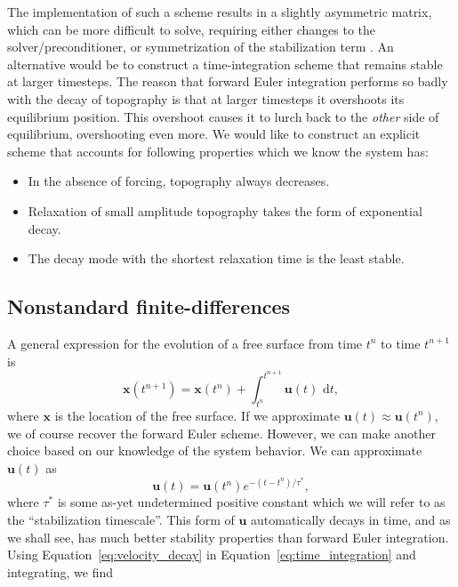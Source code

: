 \documentclass[preprint,12pt,authoryear]{elsarticle}
\begin{document}
The implementation of such a scheme results in a slightly 
asymmetric matrix, which can be more difficult to solve, requiring either
changes to the solver/preconditioner, or symmetrization of the stabilization term \citep{kaus2010stabilization}.
An alternative would be to construct a time-integration scheme that remains stable at larger timesteps.
The reason that forward Euler integration performs so badly with the decay of topography is that 
at larger timesteps it overshoots its equilibrium position. This overshoot causes it to lurch back 
to the \emph{other} side of equilibrium, overshooting even more.
We would like to construct an explicit scheme that accounts for following properties which we know the system has:
\begin{itemize}
\item In the absence of forcing, topography always decreases.
\item Relaxation of small amplitude topography takes the form of exponential decay.
\item The decay mode with the shortest relaxation time is the least stable.
\end{itemize}

\subsection{Nonstandard finite-differences}

A general expression for the evolution of a free surface from time $t^n$ to time $t^{n+1}$ is 
\begin{equation}
\mathbf{x}(t^{n+1}) = \mathbf{x}(t^n) + \int_{t^{n}}^{t^{n+1}} \mathbf{u}(t) \text{ d}t,
\label{eq:time_integration}
\end{equation}
where $\mathbf{x}$ is the location of the free surface.  If we approximate $\mathbf{u}(t) \approx \mathbf{u}(t^{n})$, 
we of course recover the forward Euler scheme.
However, we can make another choice based on our knowledge of the system behavior. 
We can approximate $\mathbf{u}(t)$ as
\begin{equation}
\mathbf{u}(t) = \mathbf{u}(t^n) e^{-(t-t^n)/\tau^*},
\label{eq:velocity_decay}
\end{equation}
where $\tau^*$ is some as-yet undetermined positive constant which we will refer to as the ``stabilization timescale''.
This form of $\mathbf{u}$ automatically decays in time, and as we shall see, has much better 
stability properties than forward Euler integration.
Using Equation~\eqref{eq:velocity_decay} in Equation~\eqref{eq:time_integration} and integrating, we find
\end{document}

